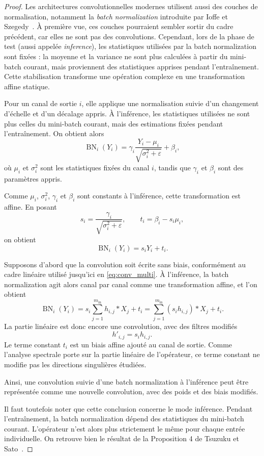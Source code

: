 \begin{proof}

Les architectures convolutionnelles modernes utilisent aussi des couches de normalisation, notamment la
\textit{batch normalization} introduite par Ioffe et Szegedy~\cite{ioffe2015batch}. À première vue, ces couches pourraient sembler sortir du cadre précédent, car elles
ne sont pas des convolutions. Cependant, lors de la phase de test (aussi appelée \textit{inference}), les statistiques utilisées par la batch normalization sont
fixées : la moyenne et la variance ne sont plus calculées à partir du mini-batch courant, mais proviennent des
statistiques apprises pendant l'entraînement.
Cette stabilisation transforme une opération complexe en une transformation affine statique.

Pour un canal de sortie $i$, elle applique une normalisation suivie d'un changement
d'échelle et d'un décalage appris. À l'inférence, les statistiques utilisées ne sont plus
celles du mini-batch courant, mais des estimations fixées pendant l'entraînement. On obtient
alors
\[
\operatorname{BN}_i(Y_i)
=
\gamma_i \frac{Y_i - \mu_i}{\sqrt{\sigma_i^2+\varepsilon}} + \beta_i,
\]
où $\mu_i$ et $\sigma_i^2$ sont les statistiques fixées du canal $i$, tandis que
$\gamma_i$ et $\beta_i$ sont des paramètres appris.

Comme $\mu_i$, $\sigma_i^2$, $\gamma_i$ et $\beta_i$ sont constants à l'inférence, cette
transformation est affine. En posant
\[
s_i = \frac{\gamma_i}{\sqrt{\sigma_i^2+\varepsilon}},
\qquad
t_i = \beta_i - s_i\mu_i,
\]
on obtient
\[
\operatorname{BN}_i(Y_i) = s_iY_i + t_i.
\]

Supposons d'abord que la convolution soit écrite sans biais, conformément au cadre linéaire utilisé
jusqu'ici en \eqref{eq:conv_multi}. À l'inférence, la batch normalization agit alors canal par canal
comme une transformation affine, et l'on obtient
\[
\operatorname{BN}_i(Y_i)
=
s_i \sum_{j=1}^{m_{\mathrm{in}}} h_{i,j} * X_j + t_i
=
\sum_{j=1}^{m_{\mathrm{in}}} (s_i h_{i,j}) * X_j + t_i.
\]
La partie linéaire est donc encore une convolution, avec des filtres modifiés
\[
h'_{i,j}=s_i h_{i,j}.
\]
Le terme constant $t_i$ est un biais affine ajouté au canal de sortie. 
Comme l'analyse spectrale porte sur la partie linéaire de l'opérateur, ce terme constant ne modifie pas les 
directions singulières étudiées.

Ainsi, une convolution suivie d'une batch normalization à l'inférence peut être représentée comme une nouvelle
convolution, avec des poids et des biais modifiés.

Il faut toutefois noter que cette conclusion concerne le mode inférence. Pendant l'entraînement, la batch
normalization dépend des statistiques du mini-batch courant. L'opérateur n'est alors plus strictement le même
pour chaque entrée individuelle. On retrouve bien le résultat de la Proposition 4 de Tsuzuku et Sato~\cite{tsuzuku2019structural}.

\end{proof}

